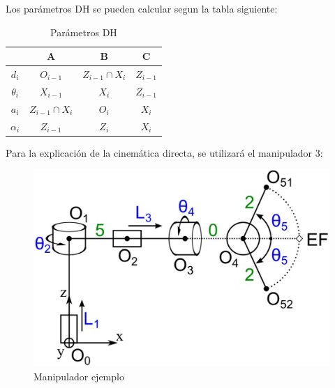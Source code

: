 \documentclass[11pt]{report}
\begin{document}
Los parámetros DH se pueden calcular segun la tabla siguiente:
\begin{table}[H]
  \centering
  \begin{tabular}{|c|c|c|c|}
    \hline
    \textbf{}           & \textbf{A}                 & \textbf{B}                 & \textbf{C}         \\ \hline
    \textbf{$d_i$}      & \texttt{$O_{i-1}$}         & \texttt{$Z_{i-1}\cap X_i$} & \texttt{$Z_{i-1}$} \\ \hline
    \textbf{$\theta_i$} & \texttt{$X_{i-1}$}         & \texttt{$X_{i}$}           & \texttt{$Z_{i-1}$} \\ \hline
    \textbf{$a_i$}      & \texttt{$Z_{i-1}\cap X_i$} & \texttt{$O_{i}$}           & \texttt{$X_{i}$}   \\ \hline
    \textbf{$\alpha_i$} & \texttt{$Z_{i-1}$}         & \texttt{$Z_{i}$}           & \texttt{$X_{i}$}   \\ \hline
  \end{tabular}
  \caption{Parámetros DH}
  \label{tab:parametros dh}
\end{table}

Para la explicación de la cinemática directa, se utilizará el manipulador 3:
\begin{figure}[H]
  \centering
  \includegraphics[scale=0.24]{img/manipulador.png}
  \caption{Manipulador ejemplo}
  \label{fig:manipulador 3}
\end{figure}
\end{document}
